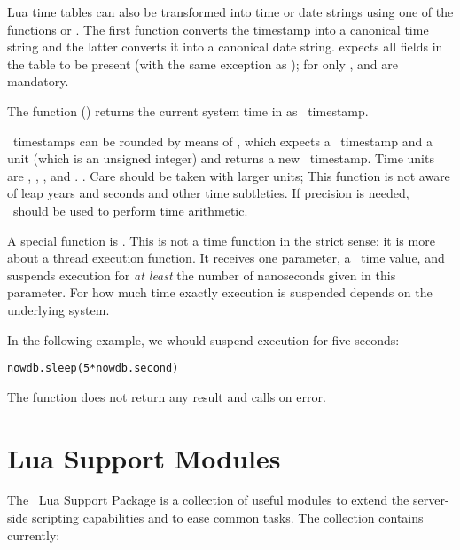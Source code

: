 Lua time tables can also be transformed into time or date
strings using one of the functions
 or
.
The first function converts the timestamp
into a canonical time string and the latter
converts it into a canonical date string.
 expects all fields in the
table to be present (with the same exception
as );
for  only ,
 and  are mandatory.

The function () returns
the current system time in 
as \nowdb\ timestamp.

\nowdb\ timestamps can be rounded by means of
, which expects a \nowdb\ time\-stamp
and a unit (which is an unsigned integer)
and returns a new \nowdb\ time\-stamp.
Time units are
,
,
,
 and
. .
Care should be taken with larger units;
This function is not aware of leap years and seconds
and other time subtleties. If precision is needed,
\sql\ should be used to perform time arithmetic.

A special function is .
This is not a time function in the strict sense;
it is more about a thread execution function.
It receives one parameter, a \nowdb\ time value,
and suspends execution for \emph{at least}
the number of nanoseconds
given in this parameter.
For how much time exactly execution is suspended
depends on the underlying system.

In the following example,
we whould suspend execution for five seconds:

\begin{lua}
\begin{lstlisting}
nowdb.sleep(5*nowdb.second)
\end{lstlisting}
\end{lua}

The function does not return any result
and calls  on error.

\section{Lua Support Modules}\label{sec_luasupp}
The \nowdb\ Lua Support Package is a collection
of useful modules to extend the server-side
scripting capabilities and to ease common tasks.
The collection contains currently:

